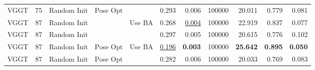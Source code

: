 \begin{table}[H]
\begin{tabular}{lrlllrrrrrr}
VGGT & 75 & Random Init & Pose Opt &  & 0.293 & 0.006 & 100000 & 20.011 & 0.779 & 0.081 \\
VGGT & 87 & Random Init &  & Use BA & 0.268 & \underline{0.004} & 100000 & 22.919 & 0.837 & 0.077 \\
VGGT & 87 & Random Init &  &  & 0.297 & 0.005 & 100000 & 20.615 & 0.776 & 0.102 \\
VGGT & 87 & Random Init & Pose Opt & Use BA & \underline{0.196} & \textbf{0.003} & 100000 & \textbf{25.642} & \textbf{0.895} & \textbf{0.050} \\
VGGT & 87 & Random Init & Pose Opt &  & 0.282 & 0.006 & 100000 & 20.033 & 0.769 & 0.083 \\
\bottomrule
\end{tabular}
\end{table}